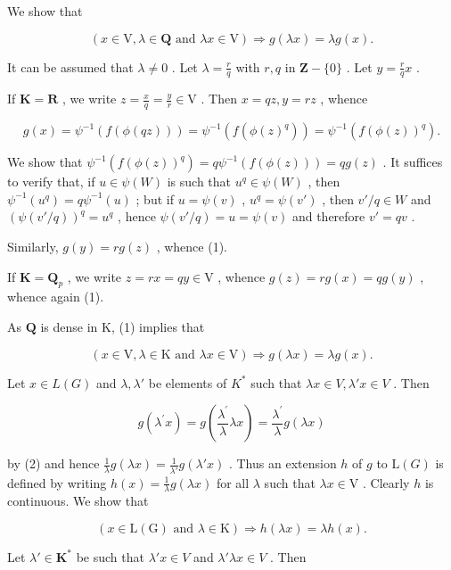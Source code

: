 We show that

\[
(x \in \mathrm{V}, \lambda \in \mathbf {Q} \text {   and   } \lambda x \in \mathrm{V}) \Rightarrow g (\lambda x) = \lambda g (x).\tag{1}
\]

It can be assumed that \(\lambda \neq 0\) . Let \(\lambda = \frac{r}{q}\) with \(r, q\) in \(\mathbf{Z} - \{0\}\) . Let \(y = \frac{r}{q} x\) .

If \(\mathbf{K} = \mathbf{R}\) , we write \(z = \frac{x}{q} = \frac{y}{r} \in \mathrm{V}\) . Then \(x = qz, y = rz\) , whence

\[
g (x) = \psi^ {- 1} (f (\phi (q z))) = \psi^ {- 1} (f (\phi (z) ^ {q})) = \psi^ {- 1} (f (\phi (z)) ^ {q}).
\]

We show that \(\psi^{-1}(f(\phi(z))^q) = q\psi^{-1}(f(\phi(z))) = qg(z)\) . It suffices to verify that, if \(u \in \psi(W)\) is such that \(u^q \in \psi(W)\) , then \(\psi^{-1}(u^q) = q\psi^{-1}(u)\) ; but if \(u = \psi(v)\) , \(u^q = \psi(v')\) , then \(v'/q \in W\) and \((\psi(v'/q))^q = u^q\) , hence \(\psi(v'/q) = u = \psi(v)\) and therefore \(v' = qv\) .

Similarly, \(g(y) = rg(z)\) , whence (1).

If \(\mathbf{K} = \mathbf{Q}_p\) , we write \(z = rx = qy \in \mathrm{V}\) , whence \(g(z) = rg(x) = qg(y)\) , whence again (1).

As \(\mathbf{Q}\) is dense in K, (1) implies that

\[
(x \in \mathrm{V}, \lambda \in \mathrm{K} \text {   and   } \lambda x \in \mathrm{V}) \Rightarrow g (\lambda x) = \lambda g (x).\tag{2}
\]

Let \(x \in L(G)\) and \(\lambda, \lambda'\) be elements of \(K^*\) such that \(\lambda x \in V, \lambda' x \in V\) . Then

\[
g (\lambda^ {\prime} x) = g \left(\frac {\lambda^ {\prime}}{\lambda} \lambda x\right) = \frac {\lambda^ {\prime}}{\lambda} g (\lambda x)
\]

by (2) and hence \(\frac{1}{\lambda} g(\lambda x) = \frac{1}{\lambda'} g(\lambda' x)\) . Thus an extension \(h\) of \(g\) to \(\mathrm{L}(G)\) is defined by writing \(h(x) = \frac{1}{\lambda} g(\lambda x)\) for all \(\lambda\) such that \(\lambda x \in \mathrm{V}\) . Clearly \(h\) is continuous. We show that

\[
(x \in \mathrm{L} (\mathrm{G}) \text {   and   } \lambda \in \mathrm{K}) \Rightarrow h (\lambda x) = \lambda h (x).\tag{3}
\]

Let \(\lambda' \in \mathbf{K}^*\) be such that \(\lambda' x \in V\) and \(\lambda' \lambda x \in V\) . Then

